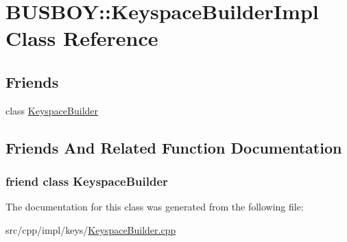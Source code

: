 \hypertarget{classBUSBOY_1_1KeyspaceBuilderImpl}{
\section{BUSBOY::KeyspaceBuilderImpl Class Reference}
\label{classBUSBOY_1_1KeyspaceBuilderImpl}
}
\subsection*{Friends}
\begin{DoxyCompactItemize}
\item 
class \hyperlink{classBUSBOY_1_1KeyspaceBuilderImpl_a93bb981319361df056cd57b2494d50c5}{KeyspaceBuilder}
\end{DoxyCompactItemize}


\subsection{Friends And Related Function Documentation}
\hypertarget{classBUSBOY_1_1KeyspaceBuilderImpl_a93bb981319361df056cd57b2494d50c5}{
\subsubsection[{KeyspaceBuilder}]{\setlength{\rightskip}{0pt plus 5cm}friend class {\bf KeyspaceBuilder}}}
\label{classBUSBOY_1_1KeyspaceBuilderImpl_a93bb981319361df056cd57b2494d50c5}


The documentation for this class was generated from the following file:\begin{DoxyCompactItemize}
\item 
src/cpp/impl/keys/\hyperlink{KeyspaceBuilder_8cpp}{KeyspaceBuilder.cpp}\end{DoxyCompactItemize}
